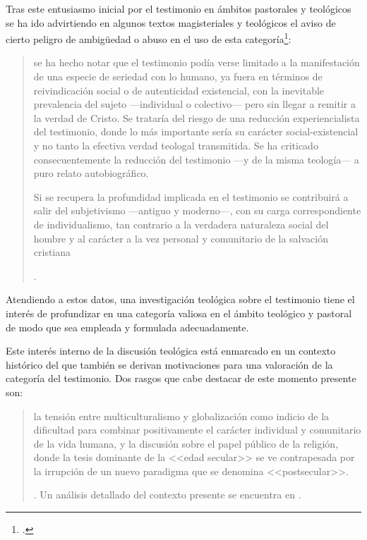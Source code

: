 Tras este entusiasmo inicial por el testimonio en ámbitos pastorales y teológicos se ha ido advirtiendo en algunos textos magisteriales y teológicos el aviso de cierto peligro de ambigüedad o abuso en el uso de esta categoría\footcite[Cf.][83]{prades2015testimonio}: \blockquote[{\Cite[84]{prades2015testimonio}}.]{se ha hecho notar que el testimonio podía verse limitado a la manifestación de una especie de seriedad con lo humano, ya fuera en términos de reivindicación social o de autenticidad existencial, con la inevitable prevalencia del sujeto ---individual o colectivo--- pero sin llegar a remitir a la verdad de Cristo. \textelp{}
Se trataría del riesgo de una reducción experiencialista del testimonio, donde lo más importante sería su carácter social-existencial y no tanto la efectiva verdad teologal transmitida. Se ha criticado consecuentemente la reducción del testimonio ---y de la misma teología--- a puro relato autobiográfico.

Si se recupera la profundidad implicada en el testimonio se contribuirá a salir del subjetivismo ---antiguo y moderno---, con su carga correspondiente de individualismo, tan contrario a la verdadera naturaleza social del hombre y al carácter a la vez personal y comunitario de la salvación cristiana}. Atendiendo a estos datos, una investigación teológica sobre el testimonio tiene el interés de profundizar en una categoría valiosa en el ámbito teológico y pastoral de modo que sea empleada y formulada adecuadamente.

Este interés interno de la discusión teológica está enmarcado en un contexto histórico del que también se derivan motivaciones para una valoración de la categoría del testimonio. Dos rasgos que cabe destacar de este momento presente son: \blockquote[{\Cite[75]{prades2015testimonio}}. Un análisis detallado del contexto presente se encuentra en {\cite[3-77]{prades2015testimonio}}.]{la tensión entre multiculturalismo y globalización como indicio de la dificultad para combinar positivamente el carácter individual y comunitario de la vida humana, y la discusión sobre el papel público de la religión, donde la tesis dominante de la <<edad secular>> se ve contrapesada por la irrupción de un nuevo paradigma que se denomina <<postsecular>>.}

